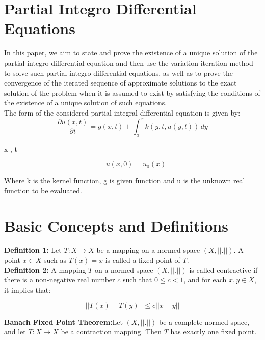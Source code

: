 \documentclass[12pt, a4paper]{report}
\begin{document}
\section{Partial Integro Differential Equations}
In this paper, we aim to state and prove the existence of a unique solution of the partial integro-differential equation and then use the variation iteration method to solve such partial integro-differential equations, as well as to prove the convergence of the iterated sequence of approximate solutions to the exact solution of the problem when it is assumed to exist by satisfying the conditions of the existence of a unique solution of such equations. \\
The form of the considered partial integral differential equation is given by: \\
\begin{equation}
    \frac{\partial u(x,t)}{\partial t} = g(x,t) + \int_{a}^{x} k(y,t, u(y,t) )\, dy
\end{equation}

x \in [a,b], \quad t \in [0,T]

\begin{equation}
    \quad u(x,0) = u_0(x)
\end{equation}

Where k is the kernel function, g is given function
and u is the unknown real function to be evaluated.

\section{Basic Concepts and Definitions}



    \textbf{Definition 1:} Let \( T: X \rightarrow X \) be a mapping on a normed space \( (X, ||.||) \). A point \( x \in X \) such as \( T(x) = x \) is called a fixed point of \( T \). \\

    \textbf{Definition 2:} A mapping \( T \) on a normed space \( (X, ||.||) \) is called contractive if there is a non-negative real number \( c \) such that \( 0 \leq c < 1 \), and for each \( x, y \in X \), it implies that:

\[ || T(x) - T(y) || \leq c || x - y || \]

\textbf{Banach Fixed Point Theorem:}Let \( (X, ||.||) \) be a complete normed space, and let \( T : X \rightarrow X \) be a contraction mapping. Then \( T \) has exactly one fixed point.
\end{document}
